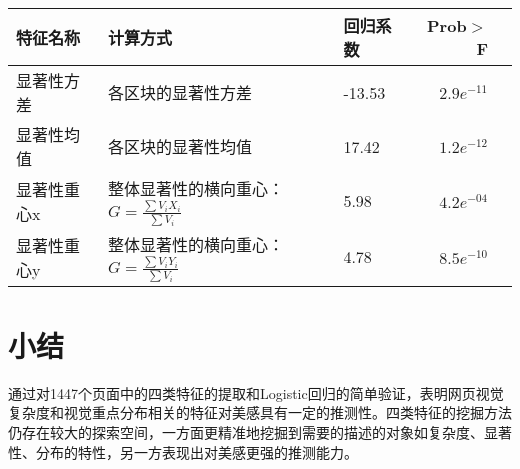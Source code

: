 \begin{table}[H]
  \centering
  \small
  \begin{tabular}{lllrr}
    \hline
     特征名称 & 计算方式 & 回归系数 & Prob$>$F \\
    \hline
    显著性方差 & 各区块的显著性方差 & -13.53 & $2.9e^{-11}$\\
    显著性均值 & 各区块的显著性均值 & 17.42 & $1.2e^{-12}$\\
    显著性重心x & 整体显著性的横向重心：$G = \frac{\sum V_i X_i}{\sum V_i}$& 5.98 & $4.2e^{-04}$\\
    显著性重心y & 整体显著性的横向重心：$G = \frac{\sum V_i Y_i}{\sum V_i}$ & 4.78 & $8.5e^{-10}$\\
    \hline
  \end{tabular}
\end{table}


\section{小结}
通过对1447个页面中的四类特征的提取和Logistic回归的简单验证，表明网页视觉复杂度和视觉重点分布相关的特征对美感具有一定的推测性。四类特征的挖掘方法仍存在较大的探索空间，一方面更精准地挖掘到需要的描述的对象如复杂度、显著性、分布的特性，另一方表现出对美感更强的推测能力。
